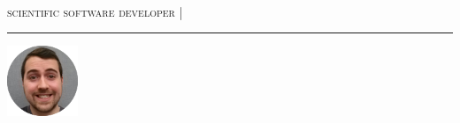 \thispagestyle{frontpage}
\begin{minipage}[b]{0.8\textwidth}
    \begin{flushleft}
        \fontsize{24}{20} \selectfont \textsc{\myname{}} \\
        \fontsize{12}{14} \textsc{scientific software developer |}
        {\normalsize \myemail{}}
    \end{flushleft}
    \textcolor{gray}{\rule{\textwidth}{0.1mm}}
\end{minipage}
\begin{minipage}[b]{0.2\textwidth}
   \begin{flushright}
       \includegraphics[width=80px]{headshot-circle}
   \end{flushright}
\end{minipage}
